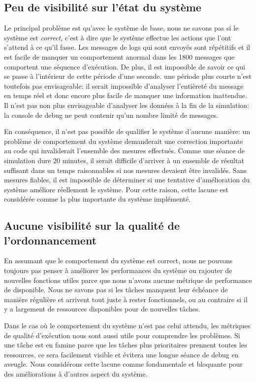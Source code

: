 \documentclass[journal]{IEEEtran}
\begin{document}
\subsection{Peu de visibilité sur l'état du système}

Le principal problème est qu'avec le système de base, nous ne savons pas si le système est \emph{correct}, c'est à dire que le système effectue les actions que l'ont s'attend à ce qu'il fasse. Les messages de logs qui sont envoyés sont répétitifs et il est facile de manquer un comportement anormal dans les 1800 messages que comportent une séquence d'exécution. De plus, il est impossible de savoir ce qui se passe à l'intérieur de cette période d'une seconde. une période plus courte n'est toutefois pas envisageable: il serait impossible d'analyser l'entièreté du message en temps réel et donc encore plus facile de manquer une information inattendue. Il n'est pas non plus envisageable d'analyser les données à la fin de la simulation: la console de debug ne peut contenir qu'un nombre limité de messages.

En conséquence, il n'est pas possible de qualifier le système d'aucune manière: un problème de comportement du système demanderait une correction importante au code qui invaliderait l'ensemble des mesures effectués. Comme une séance de simulation dure 20 minutes, il serait difficile d'arriver à un ensemble de résultat suffisant dans un temps raisonnables si nos mesures devaient être invalidés. Sans mesures fiables, il est impossible de déterminer si une tentative d'amélioration du système améliore réellement le système. Pour cette raison, cette lacune est considérée comme la plus importante du système implémenté.

\subsection{Aucune visibilité sur la qualité de l'ordonnancement}

En assumant que le comportement du système est correct, nous ne pouvons toujours pas penser à améliorer les performances du système ou rajouter de nouvelles fonctions utiles parce que nous n'avons aucune métrique de performance de disponible. Nous ne savons pas si les tâches manquent leur échéance de manière régulière et arrivent tout juste à rester fonctionnels, ou au contraire si il y a largement de ressources disponibles pour de nouvelles tâches.

Dans le cas où le comportement du système n'est pas celui attendu, les métriques de qualité d'exécution nous sont aussi utile pour comprendre les problèmes. Si une tâche est en famine parce que les tâches plus prioritaires prennent toutes les ressources, ce sera facilement visible et évitera une longue séance de debug en aveugle. Nous considérons cette lacune comme fondamentale et bloquante pour des améliorations à d'autres aspect du système.
\end{document}
